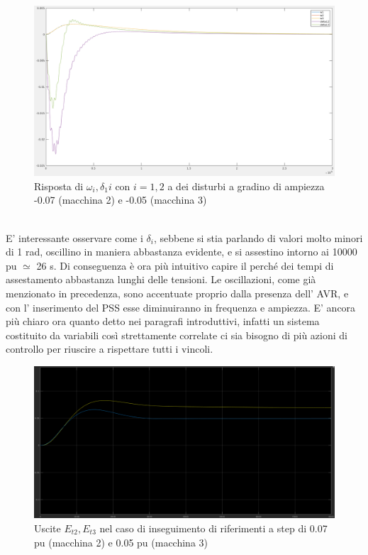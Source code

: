 \documentclass[Lau,noexaminfo]{sapthesis}
\begin{document}
	\begin{figure}[h]
		\centering
			\includegraphics[scale=0.26]{simulazione_oscillazione_disturbo}
			\caption{Risposta di $\omega_i,\delta_1i$ con $i=1,2$ a dei disturbi a gradino di ampiezza -0.07 (macchina 2) e -0.05 (macchina 3)}
	\end{figure}\\
	E' interessante osservare come i $\delta_i$, sebbene si stia parlando di valori molto minori di 1 rad, oscillino in maniera abbastanza evidente, e si assestino intorno ai 10000 pu $\simeq$ 26 s. Di conseguenza è ora più intuitivo capire il perché dei tempi di assestamento abbastanza lunghi delle tensioni. Le oscillazioni, come già menzionato in precedenza, sono accentuate proprio dalla presenza dell' AVR, e con l' inserimento del PSS esse diminuiranno in frequenza e ampiezza. E' ancora più chiaro ora quanto detto nei paragrafi introduttivi, infatti un sistema costituito da variabili così strettamente correlate ci sia bisogno di più azioni di controllo per riuscire a rispettare tutti i vincoli.
	\begin{figure}
		\centering
			\includegraphics[scale=0.33,angle=-90]{Simulazione_riferimento}
			\caption{Uscite $E_{t2},E_{t3}$ nel caso di inseguimento di riferimenti a step di 0.07 pu (macchina 2) e 0.05 pu (macchina 3)}
	\end{figure}
\end{document}
